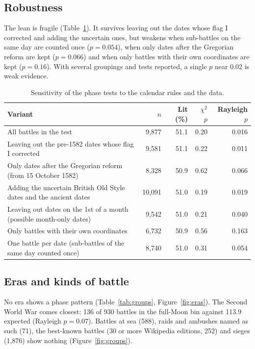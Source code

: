 \documentclass[11pt,a4paper]{article}
\begin{document}
\subsection{Robustness}
The lean is fragile (Table~\ref{tab:sens}). It survives leaving out the dates whose flag I corrected and adding the uncertain ones, but weakens when sub-battles on the same day are counted once ($p=0.054$), when only dates after the Gregorian reform are kept ($p=0.066$) and when only battles with their own coordinates are kept ($p=0.16$). With several groupings and tests reported, a single $p$ near 0.02 is weak evidence.

\begin{table}[tbp]\centering\footnotesize\caption{Sensitivity of the phase tests to the calendar rules and the data.}\label{tab:sens}\begin{tabular}{p{8.2cm}rrrr}\toprule Variant & $n$ & Lit (\%) & $\chi^2$ $p$ & Rayleigh $p$\\\midrule
All battles in the test & 9,877 & 51.1 & 0.20 & 0.016\\
Leaving out the pre-1582 dates whose flag I corrected & 9,581 & 51.1 & 0.22 & 0.011\\
Only dates after the Gregorian reform (from 15 October 1582) & 8,328 & 50.9 & 0.62 & 0.066\\
Adding the uncertain British Old Style dates and the ancient dates & 10,091 & 51.0 & 0.19 & 0.019\\
Leaving out dates on the 1st of a month (possible month-only dates) & 9,542 & 51.0 & 0.21 & 0.040\\
Only battles with their own coordinates & 6,732 & 50.9 & 0.56 & 0.163\\
One battle per date (sub-battles of the same day counted once) & 8,740 & 51.0 & 0.31 & 0.054\\
\bottomrule\end{tabular}\end{table}

\subsection{Eras and kinds of battle}
No era shows a phase pattern (Table~\ref{tab:groups}, Figure~\ref{fig:eras}). The Second World War comes closest: 136 of 930 battles in the full-Moon bin against 113.9 expected (Rayleigh $p=0.07$). Battles at sea (588), raids and ambushes named as such (71), the best-known battles (30 or more Wikipedia editions, 252) and sieges (1,876) show nothing (Figure~\ref{fig:groups}).
\end{document}
